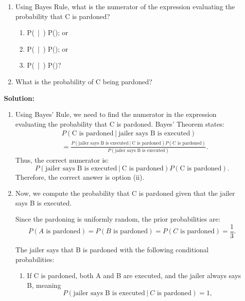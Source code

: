 \documentclass[12pt]{article}
\newif\ifsolutions
\begin{document}
\begin{enumerate}
    \begin{enumerate}[label=(\alph*)]
        \item Using Bayes Rule, what is the numerator of the expression evaluating the probability that C is pardoned?
        \begin{enumerate}[label=(\roman*)]
            \item P(\ |\ ) P(); or
            \item P(\ |\ ) P(); or
            \item P(\ |\ ) P()?
        \end{enumerate}
        \item What is the probability of C being pardoned?
    \end{enumerate}

    \ifsolutions \color{blue} \textbf{Solution:} \\
    \begin{enumerate}[label=(\alph*)]
        \item Using Bayes' Rule, we need to find the numerator in the expression evaluating the probability that C is pardoned. Bayes' Theorem states:
        \begin{align*}
            &P(\text{C is pardoned} \ | \ \text{jailer says B is executed}) \\
            &= \frac{P(\text{jailer says B is executed} \ | \ \text{C is pardoned}) P(\text{C is pardoned})}{P(\text{jailer says B is executed})}.
        \end{align*}
        Thus, the correct numerator is:
        \[
        P(\text{jailer says B is executed} \ | \ \text{C is pardoned}) P(\text{C is pardoned}).
        \]
        Therefore, the correct answer is option (ii).
    
        \item Now, we compute the probability that C is pardoned given that the jailer says B is executed.
    
        Since the pardoning is uniformly random, the prior probabilities are:
        \[
        P(A \text{ is pardoned}) = P(B \text{ is pardoned}) = P(C \text{ is pardoned}) = \frac{1}{3}.
        \]
    
        The jailer says that B is pardoned with the following conditional probabilities:
        \begin{enumerate}[label=\roman*.]
            \item If C is pardoned, both A and B are executed, and the jailer always says B, meaning
            \[
            P(\text{jailer says B is executed} \ | \ C \text{ is pardoned}) = 1, 
            \]
            

\end{enumerate}
\end{enumerate}
\end{enumerate}
\end{document}
